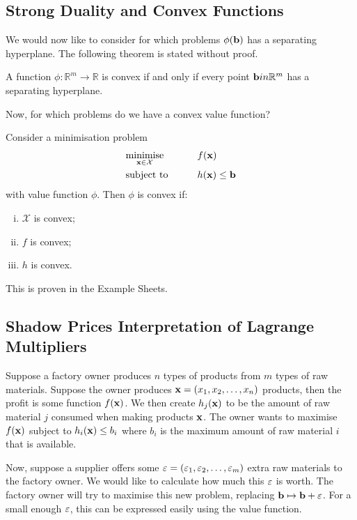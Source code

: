 \subsection{Strong Duality and Convex Functions}
We would now like to consider for which problems \( \phi(\vb b) \) has a separating hyperplane.
The following theorem is stated without proof.
\begin{theorem}
	A function \( \phi \colon \mathbb R^m \to \mathbb R \) is convex if and only if every point \( \vb b in \mathbb R^m \) has a separating hyperplane.
\end{theorem}
Now, for which problems do we have a convex value function?
\begin{theorem}
	Consider a minimisation problem
	\begin{alignat*}{2}
		 & \underset{\vb x \in \mathcal X}{\text{minimise}} & \qquad & f(\vb x)            \\
		 & \text{subject to}                                &        & h(\vb x) \leq \vb b
	\end{alignat*}
	with value function \( \phi \).
	Then \( \phi \) is convex if:
	\begin{enumerate}[(i)]
		\item \( \mathcal X \) is convex;
		\item \( f \) is convex;
		\item \( h \) is convex.
	\end{enumerate}
\end{theorem}
\noindent This is proven in the Example Sheets.

\subsection{Shadow Prices Interpretation of Lagrange Multipliers}
Suppose a factory owner produces \( n \) types of products from \( m \) types of raw materials.
Suppose the owner produces \( \vb x = (x_1, x_2, \dots, x_n) \) products, then the profit is some function \( f(\vb x) \).
We then create \( h_j(\vb x) \) to be the amount of raw material \( j \) consumed when making products \( \vb x \).
The owner wants to maximise \( f(\vb x) \) subject to \( h_i(\vb x) \leq b_i \) where \( b_i \) is the maximum amount of raw material \( i \) that is available.

Now, suppose a supplier offers some \( \vb\varepsilon = (\varepsilon_1, \varepsilon_2, \dots, \varepsilon_m) \) extra raw materials to the factory owner.
We would like to calculate how much this \( \vb\varepsilon \) is worth.
The factory owner will try to maximise this new problem, replacing \( \vb b \mapsto \vb b + \vb\varepsilon \).
For a small enough \( \vb\varepsilon \), this can be expressed easily using the value function.

